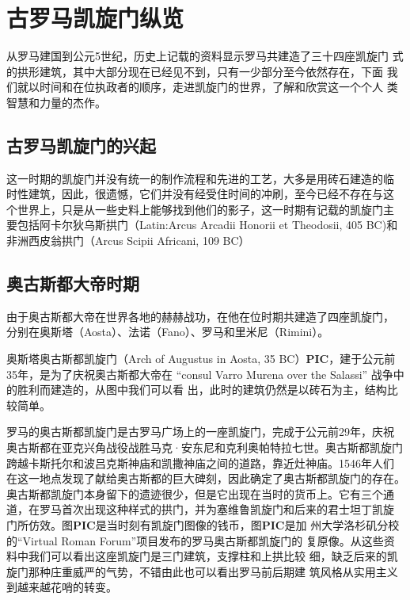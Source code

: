 \documentclass[a4paper,dvipdfm]{article}
\begin{document}
\section{古罗马凯旋门纵览}

从罗马建国到公元5世纪，历史上记载的资料显示罗马共建造了三十四座凯旋门
式的拱形建筑，其中大部分现在已经见不到，只有一少部分至今依然存在，下面
我们就以时间和在位执政者的顺序，走进凯旋门的世界，了解和欣赏这一个个人
类智慧和力量的杰作。

\subsection{古罗马凯旋门的兴起}

这一时期的凯旋门并没有统一的制作流程和先进的工艺，大多是用砖石建造的临
时性建筑，因此，很遗憾，它们并没有经受住时间的冲刷，至今已经不存在与这
个世界上，只是从一些史料上能够找到他们的影子，这一时期有记载的凯旋门主
要包括阿卡尔狄乌斯拱门（\textsf{Latin:Arcus Arcadii Honorii et
  Theodosii, 405 BC})和非洲西皮翁拱门（\textsf{Arcus Scipii Africani,
  109 BC}）

\subsection{奥古斯都大帝时期}

由于奥古斯都大帝在世界各地的赫赫战功，在他在位时期共建造了四座凯旋门，
分别在奥斯塔（Aosta）、法诺（Fano）、罗马和里米尼（Rimini）。

奥斯塔奥古斯都凯旋门（Arch of Augustus in Aosta, 35
BC）\textbf{PIC}，建于公元前35年，是为了庆祝奥古斯都大帝在 ``consul
Varro Murena over the Salassi'' 战争中的胜利而建造的，从图中我们可以看
出，此时的建筑仍然是以砖石为主，结构比较简单。

罗马的奥古斯都凯旋门是古罗马广场上的一座凯旋门，完成于公元前29年，庆祝
奥古斯都在亚克兴角战役战胜马克·安东尼和克利奥帕特拉七世。奥古斯都凯旋门
跨越卡斯托尔和波吕克斯神庙和凯撒神庙之间的道路，靠近灶神庙。1546年人们
在这一地点发现了献给奥古斯都的巨大碑刻，因此确定了奥古斯都凯旋门的存在。
奥古斯都凯旋门本身留下的遗迹很少，但是它出现在当时的货币上。它有三个通
道，在罗马首次出现这种样式的拱门，并为塞维鲁凯旋门和后来的君士坦丁凯旋
门所仿效。图\textbf{PIC}是当时刻有凯旋门图像的钱币，图\textbf{PIC}是加
州大学洛杉矶分校的``Virtual Roman Forum''项目发布的罗马奥古斯都凯旋门的
复原像。从这些资料中我们可以看出这座凯旋门是三门建筑，支撑柱和上拱比较
细，缺乏后来的凯旋门那种庄重威严的气势，不错由此也可以看出罗马前后期建
筑风格从实用主义到越来越花哨的转变。
\end{document}
